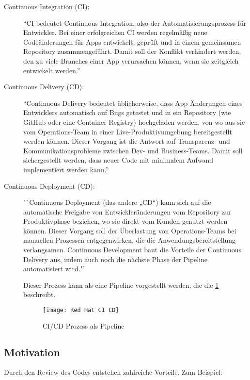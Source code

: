 \begin{description}
	\item [Continuous Integration (CI):]
		"`CI bedeutet Continuous Integration, also der Automatisierungsprozess für Entwickler. Bei einer erfolgreichen CI werden regelmäßig neue Codeänderungen für Apps entwickelt, 				geprüft und in einem gemeinsamen Repository zusammengeführt. Damit soll der Konflikt verhindert werden, den zu viele Branches einer App verursachen können, wenn sie zeitgleich 			entwickelt werden."' \cite{RedHat}
			
	\item [Continuous Delivery (CD):]
		"`Continuous Delivery bedeutet üblicherweise, dass App Änderungen eines Entwicklers automatisch auf Bugs getestet und in ein Repository (wie GitHub oder eine Container 					Registry) hochgeladen werden, von wo aus sie vom Operations-Team in einer Live-Produktivumgebung bereitgestellt werden können. Dieser Vorgang ist die Antwort auf Transparenz- 				und Kommunikationsprobleme zwischen Dev- und Business-Teams. Damit soll sichergestellt werden, dass neuer Code mit minimalem Aufwand implementiert werden kann."' \cite{RedHat}
		
	\item [Continuous Deployment (CD):]
		"`Continuous Deployment (das andere „CD“) kann sich auf die automatische Freigabe von Entwickleränderungen vom Repository zur Produktivphase beziehen, wo sie direkt vom Kunden 			genutzt werden können. Dieser Vorgang soll der Überlastung von Operations-Teams bei manuellen Prozessen entgegenwirken, die die Anwendungsbereitstellung verlangsamen. Continuous 		Development baut die Vorteile der Continuous Delivery aus, indem auch noch die nächste Phase der Pipeline automatisiert wird."' \cite{RedHat}

	Dieser Prozess kann als eine Pipeline vorgestellt werden, die die \cref{fig:RedHat} beschreibt.
	\begin{figure}[H]
		\centering
		\texttt{[image: Red Hat CI CD]}
		\caption[\ac{CI}/\ac{CD}]{\ac{CI}/\ac{CD} Prozess als Pipeline\\ \cite{RedHat}}
		\label{fig:RedHat}
	\end{figure}
	
\end{description}

\subsection{Motivation}
\label{subsec:Gründe}
Durch den Review des Codes entstehen zahlreiche Vorteile. Zum Beispiel:

